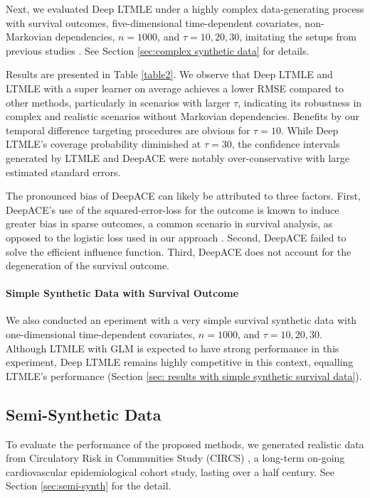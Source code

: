 \documentclass{article}
\theoremstyle{plain}
\theoremstyle{definition}
\theoremstyle{remark}
\begin{document}
Next, we evaluated Deep LTMLE under a highly complex data-generating process with survival outcomes, five-dimensional time-dependent covariates, non-Markovian dependencies, $n=1000$, and $\tau=10,20,30$, imitating the setups from previous studies \cite{Bica2020Estimating, Frauen_Hatt_Melnychuk_Feuerriegel_2023}. See Section \ref{sec:complex synthetic data} for details.

Results are presented in Table \ref{table2}. We observe that Deep LTMLE and LTMLE with a super learner on average achieves a lower RMSE compared to other methods, particularly in scenarios with larger $\tau$, indicating its robustness in complex and realistic scenarios without Markovian dependencies. Benefits by our temporal difference targeting procedures are obvious for $\tau=10$. While Deep LTMLE's coverage probability diminished at $\tau=30$, the confidence intervals generated by LTMLE and DeepACE were notably over-conservative with large estimated standard errors. 

The pronounced bias of DeepACE can likely be attributed to three factors. First, DeepACE's use of the squared-error-loss for the outcome is known to induce greater bias in sparse outcomes, a common scenario in survival analysis, as opposed to the logistic loss used in our approach \cite{gruber_targeted_2010}. Second, DeepACE failed to solve the efficient influence function. Third, DeepACE does not account for the degeneration of the survival outcome. 

\paragraph{Simple Synthetic Data with Survival Outcome}
We also conducted an eperiment with a very simple survival synthetic data with one-dimensional time-dependent covariates, $n=1000$, and $\tau=10,20,30$. Although LTMLE with GLM is expected to have strong performance in this experiment, Deep LTMLE remains highly competitive in this context, equalling LTMLE’s performance (Section \ref{sec: results with simple synthetic survival data}).

\subsection{Semi-Synthetic Data}

To evaluate the performance of the proposed methods, we generated realistic data from Circulatory Risk in Communities Study (CIRCS) \cite{yamagishi2019}, a long-term on-going cardiovascular epidemiological cohort study, lasting over a half century. See Section \ref{sec:semi-synth} for the detail.
\end{document}
